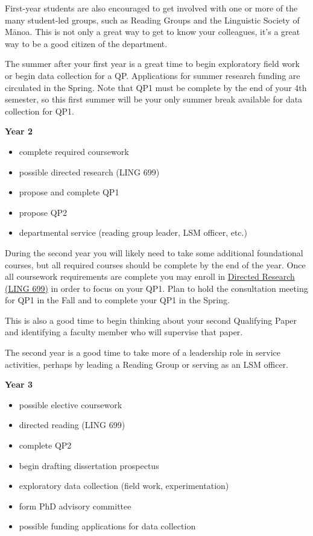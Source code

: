 \documentclass[
]{book}
\providecommand{\tightlist}{%
  \setlength{\itemsep}{0pt}\setlength{\parskip}{0pt}}
\begin{document}
First-year students are also encouraged to get involved with one or more of the many student-led groups, such as Reading Groups and the Linguistic Society of Mānoa. This is not only a great way to get to know your colleagues, it's a great way to be a good citizen of the department.

The summer after your first year is a great time to begin exploratory field work or begin data collection for a QP. Applications for summer research funding are circulated in the Spring. Note that QP1 must be complete by the end of your 4th semester, so this first summer will be your only summer break available for data collection for QP1.

\textbf{Year 2}

\begin{itemize}
\tightlist
\item
  complete required coursework
\item
  possible directed research (LING 699)
\item
  propose and complete QP1
\item
  propose QP2
\item
  departmental service (reading group leader, LSM officer, etc.)
\end{itemize}

During the second year you will likely need to take some additional foundational courses, but all required courses should be complete by the end of the year. Once all coursework requirements are complete you may enroll in \hyperref[ling699]{Directed Research (LING 699)} in order to focus on your QP1. Plan to hold the consultation meeting for QP1 in the Fall and to complete your QP1 in the Spring.

This is also a good time to begin thinking about your second Qualifying Paper and identifying a faculty member who will supervise that paper.

The second year is a good time to take more of a leadership role in service activities, perhaps by leading a Reading Group or serving as an LSM officer.

\textbf{Year 3}

\begin{itemize}
\tightlist
\item
  possible elective coursework
\item
  directed reading (LING 699)
\item
  complete QP2
\item
  begin drafting dissertation prospectus
\item
  exploratory data collection (field work, experimentation)
\item
  form PhD advisory committee
\item
  possible funding applications for data collection
\end{itemize}
\end{document}
